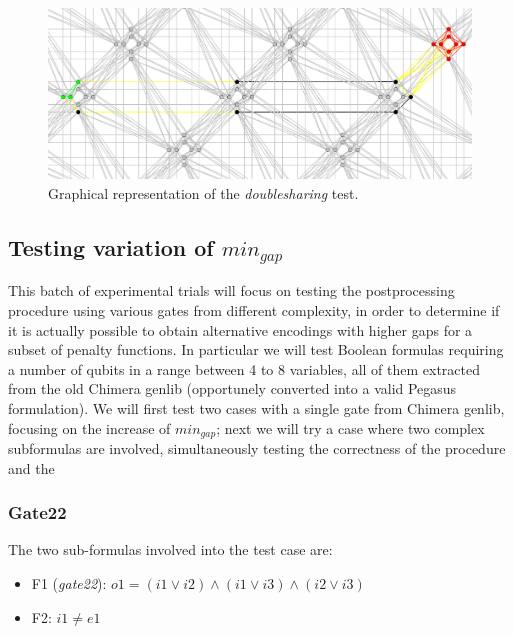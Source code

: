 \begin{figure}[!]
    \centering
    \includegraphics[width=1.0\textwidth]{images/doubleshared.PNG}
    \caption{Graphical representation of the \textit{doublesharing} test.}
    \label{fig:my_label}
\end{figure}

\newpage
\subsection{Testing variation of $min_{gap}$}

This batch of experimental trials will focus on testing the postprocessing procedure using various gates from different complexity, in order to determine if it is actually possible to obtain alternative encodings with higher gaps for a subset of penalty functions. In particular we will test Boolean formulas requiring a number of qubits in a range between 4 to 8 variables, all of them extracted from the old Chimera genlib (opportunely converted into a valid Pegasus formulation). We will first test two cases with a single gate from Chimera genlib, focusing on the increase of $min_{gap}$; next we will try a case where two complex subformulas are involved, simultaneously testing the correctness of the procedure and the  \\

\clearpage

\subsubsection{Gate22}

The two sub-formulas involved into the test case are:

\begin{itemize}
    \item F1 (\textit{gate22}): $o1 = (i1 \vee i2) \wedge (i1 \vee i3) \wedge (i2 \vee i3)$
    \item F2: $i1 \neq e1$
\end{itemize}

